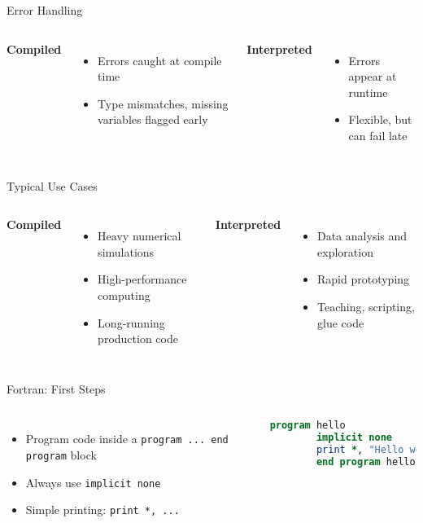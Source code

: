 \begin{frame}{Error Handling}
	\begin{columns}[T]
		\textbf{Compiled}
		\begin{itemize}
			\item Errors caught at compile time
			\item Type mismatches, missing variables flagged early
		\end{itemize}
		
		\textbf{Interpreted}
		\begin{itemize}
			\item Errors appear at runtime
			\item Flexible, but can fail late
		\end{itemize}
	\end{columns}
\end{frame}


\begin{frame}{Typical Use Cases}
	\begin{columns}[T]
		\textbf{Compiled}
		\begin{itemize}
			\item Heavy numerical simulations
			\item High-performance computing
			\item Long-running production code
		\end{itemize}
		
		\textbf{Interpreted}
		\begin{itemize}
			\item Data analysis and exploration
			\item Rapid prototyping
			\item Teaching, scripting, glue code
		\end{itemize}
	\end{columns}
\end{frame}


\begin{frame}[fragile]{Fortran: First Steps}
		\begin{columns}[T]
		\begin{itemize}
		\item Program code inside a \texttt{program ... end program} block
		\item Always use \texttt{implicit none}
		\item Simple printing: \texttt{print *, ...}
		\end{itemize}
		\begin{lstlisting}[language=Fortran]
		program hello
		implicit none
		print *, "Hello world!"
		end program hello
		\end{lstlisting}
	\end{columns}
\end{frame}

